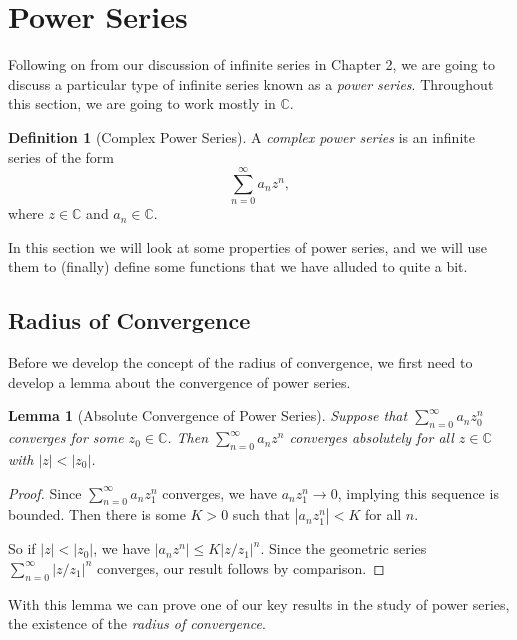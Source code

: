 \documentclass[11pt, a4paper]{article}
\newtheorem{lemma}[theorem]{Lemma}
\theoremstyle{definition}
\newtheorem{definition}[theorem]{Definition}
\newcommand{\vocab}[1]{\emph{#1}} %
\newcommand{\C}{\mathbb{C}}
\begin{document}
\clearpage
\section{Power Series}

Following on from our discussion of infinite series in Chapter 2, we are going to discuss a particular type of infinite series known as a \emph{power series}. Throughout this section, we are going to work mostly in $\C$.

\begin{definition}[Complex Power Series]
	A \vocab{complex power series} is an infinite series of the form
	$$
		\sum_{n = 0}^{\infty} a_n z^n,
	$$
	where $z \in \C$ and $a_n \in \C$.
\end{definition}

In this section we will look at some properties of power series, and we will use them to (finally) define some functions that we have alluded to quite a bit.

\subsection{Radius of Convergence}

Before we develop the concept of the radius of convergence, we first need to develop a lemma about the convergence of power series. 

\begin{lemma}[Absolute Convergence of Power Series]
Suppose that $\sum_{n = 0}^{\infty} a_n z_0^n$ converges for some $z_0 \in \C$. Then $\sum_{n = 0}^{\infty} a_n z^n$ converges absolutely for all $z\in \C$ with $|z| < |z_0|$.
\end{lemma}
\begin{proof}
Since $\sum_{n = 0}^{\infty} a_n z_1^n$ converges, we have $a_n z_1^n \rightarrow 0$, implying this sequence is bounded.
Then there is some $K > 0$ such that $|a_n z_1^n| < K$ for all $n$.	

So if $|z| < |z_0|$, we have $|a_n z^n| \leq K \left|z/z_1\right|^n$. Since the geometric series $\sum_{n = 0}^{\infty} |z/z_1|^n$ converges, our result follows by comparison.
\end{proof}

With this lemma we can prove one of our key results in the study of power series, the existence of the \emph{radius of convergence}.
\end{document}
